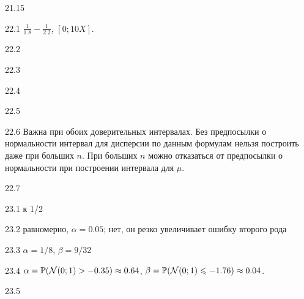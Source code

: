 \protect \hypertarget {soln:21.15}{}
\begin{solution}{{21.15}}

\end{solution}
\protect \hypertarget {soln:22.1}{}
\begin{solution}{{22.1}}
  $\frac{1}{1.8} - \frac{1}{2.2}$, $[0;10X]$.
\end{solution}
\protect \hypertarget {soln:22.2}{}
\begin{solution}{{22.2}}
\end{solution}
\protect \hypertarget {soln:22.3}{}
\begin{solution}{{22.3}}
\end{solution}
\protect \hypertarget {soln:22.4}{}
\begin{solution}{{22.4}}
\end{solution}
\protect \hypertarget {soln:22.5}{}
\begin{solution}{{22.5}}
\end{solution}
\protect \hypertarget {soln:22.6}{}
\begin{solution}{{22.6}}
Важна при обоих доверительных интервалах. Без предпосылки о нормальности интервал для дисперсии по данным формулам нельзя построить даже при больших $n$. При больших $n$ можно отказаться от предпосылки о нормальности при построении интервала для $\mu$.
\end{solution}
\protect \hypertarget {soln:22.7}{}
\begin{solution}{{22.7}}
\end{solution}
\protect \hypertarget {soln:23.1}{}
\begin{solution}{{23.1}}
к 1/2
\end{solution}
\protect \hypertarget {soln:23.2}{}
\begin{solution}{{23.2}}
  равномерно, $\alpha=0.05$; нет, он резко увеличивает ошибку второго рода
\end{solution}
\protect \hypertarget {soln:23.3}{}
\begin{solution}{{23.3}}
  $\alpha = 1/8$, $\beta = 9/32$
\end{solution}
\protect \hypertarget {soln:23.4}{}
\begin{solution}{{23.4}}
  $\alpha = \mathbb{P}(\mathcal{N}(0;1) > -0.35) \approx 0.64$, $\beta = \mathbb{P}(\mathcal{N}(0;1) \leqslant -1.76) \approx 0.04$.
\end{solution}
\protect \hypertarget {soln:23.5}{}
\begin{solution}{{23.5}}
\end{solution}
\protect \hypertarget {soln:23.6}{}
